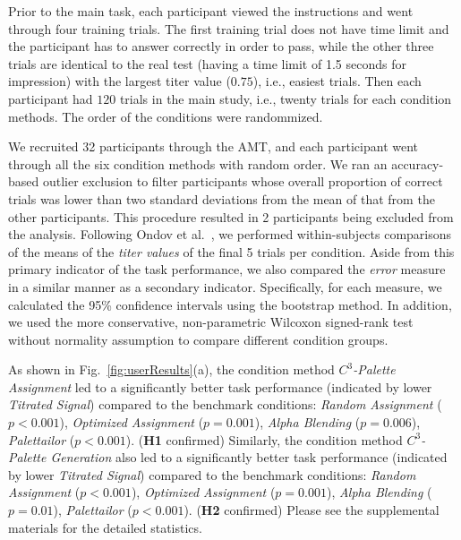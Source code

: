 {
Prior to the main task, each participant viewed the instructions and went through four training trials. The first training trial does not have time limit and the participant has to answer correctly in order to pass, while the other three trials are identical to the real test (having a time limit of 1.5 seconds for impression) with the largest titer value ($0.75$), i.e., easiest trials. Then each participant had $120$ trials in the main study, i.e., twenty trials for each condition methods. The order of the conditions were randommized.

We recruited 32 participants through the AMT, and each participant went through all the six condition methods with random order. We ran an accuracy-based outlier exclusion to filter participants whose overall proportion of correct trials was lower than two standard deviations from the mean of that from the other participants. This procedure resulted in 2 participants being excluded from the analysis. Following Ondov et al.~\cite{Ondov19}, we performed within-subjects comparisons of the means of the \emph{titer values} of the final 5 trials per condition. Aside from this primary indicator of the task performance, we also compared the \emph{error} measure in a similar manner as a secondary indicator. Specifically, for each measure, we calculated the 95\% confidence intervals using the bootstrap method. In addition, we used the more conservative, non-parametric Wilcoxon signed-rank test without normality assumption to compare different condition groups.

As shown in Fig.~\ref{fig:userResults}(a), the condition method \emph{$C^3$-Palette Assignment} led to a significantly better task performance (indicated by lower \emph{Titrated Signal}) compared to the benchmark conditions: \emph{Random Assignment} ($p<0.001$), \emph{Optimized Assignment} ($p=0.001$), \emph{Alpha Blending} ($p=0.006$), \emph{Palettailor} ($p<0.001$). (\textbf{H1} confirmed) Similarly, the condition method \emph{$C^3$-Palette Generation} also led to a significantly better task performance (indicated by lower \emph{Titrated Signal}) compared to the benchmark conditions: \emph{Random Assignment} ($p<0.001$), \emph{Optimized Assignment} ($p=0.001$), \emph{Alpha Blending} ($p=0.01$), \emph{Palettailor} ($p<0.001$). (\textbf{H2} confirmed) Please see the supplemental materials for the detailed statistics.


}
